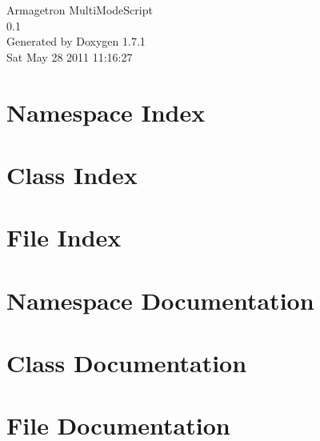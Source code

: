 \documentclass[a4paper]{book}
\begin{document}
\hypersetup{pageanchor=false}
\begin{titlepage}
\vspace*{7cm}
\begin{center}
{\Large Armagetron MultiModeScript \\[1ex]\large 0.1 }\\
\vspace*{1cm}
{\large Generated by Doxygen 1.7.1}\\
\vspace*{0.5cm}
{\small Sat May 28 2011 11:16:27}\\
\end{center}
\end{titlepage}
\clearemptydoublepage
{}
\tableofcontents
\clearemptydoublepage
{}
\hypersetup{pageanchor=true}
\chapter{Namespace Index}

\chapter{Class Index}

\chapter{File Index}

\chapter{Namespace Documentation}




\chapter{Class Documentation}







\chapter{File Documentation}











\printindex
\end{document}
